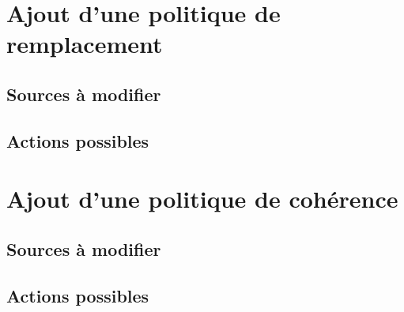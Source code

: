 \section{Ajout d'une politique de remplacement}

\subsection{Sources à modifier}

\subsection{Actions possibles}

\section{Ajout d'une politique de cohérence}
\label{tuto_aut}

\subsection{Sources à modifier}

\subsection{Actions possibles}
